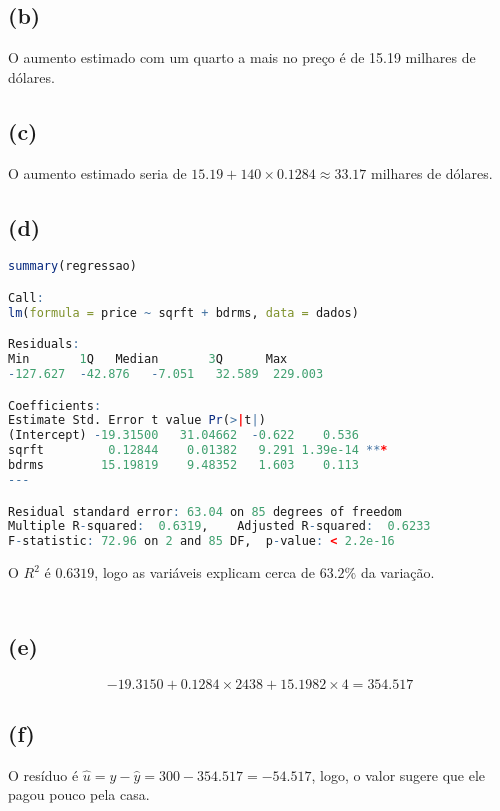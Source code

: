 \documentclass[12pt]{article}
\begin{document}
\subsection*{(b)}
O aumento estimado com um quarto a mais no preço é de 15.19 milhares de dólares.

\subsection*{(c)}
O aumento estimado seria de $15.19+140\times 0.1284\approx 33.17$ milhares de dólares.

\subsection*{(d)}

\begin{lstlisting}[language=R]
summary(regressao)

Call:
lm(formula = price ~ sqrft + bdrms, data = dados)

Residuals:
Min       1Q   Median       3Q      Max 
-127.627  -42.876   -7.051   32.589  229.003 

Coefficients:
Estimate Std. Error t value Pr(>|t|)    
(Intercept) -19.31500   31.04662  -0.622    0.536    
sqrft         0.12844    0.01382   9.291 1.39e-14 ***
bdrms        15.19819    9.48352   1.603    0.113    
---

Residual standard error: 63.04 on 85 degrees of freedom
Multiple R-squared:  0.6319,	Adjusted R-squared:  0.6233 
F-statistic: 72.96 on 2 and 85 DF,  p-value: < 2.2e-16

\end{lstlisting}

O $R^2$ é $0.6319$, logo as variáveis explicam cerca de $63.2\%$ da variação.\\\\

\subsection*{(e)}
\begin{equation*}
	-19.3150+0.1284\times2438+15.1982\times4=354.517
\end{equation*}

\subsection*{(f)}
O resíduo é $\hat{u}=y-\hat{y}=300-354.517=-54.517$, logo, o valor sugere que ele pagou pouco pela casa.
\end{document}
